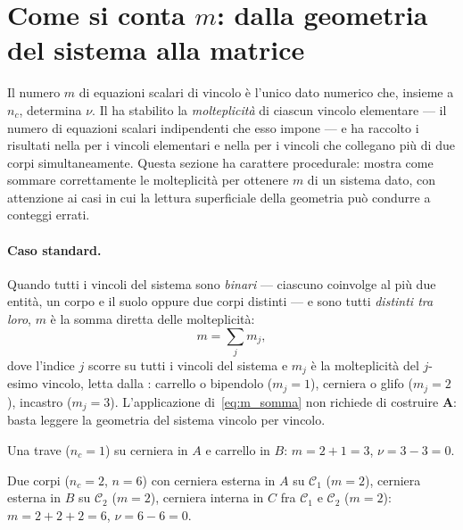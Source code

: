 \section{Come si conta \texorpdfstring{$m$}{m}: dalla geometria del sistema alla matrice}
\label{sec:conteggio_m}

Il numero $m$ di equazioni scalari di vincolo è l'unico dato
numerico che, insieme a $n_c$, determina $\nu$. Il
 ha stabilito la \emph{molteplicità}
di ciascun vincolo elementare --- il numero di equazioni scalari
indipendenti che esso impone --- e ha raccolto i risultati nella
 per i vincoli elementari e nella
 per i vincoli che collegano più
di due corpi simultaneamente. Questa sezione ha carattere
procedurale: mostra come sommare correttamente le molteplicità
per ottenere $m$ di un sistema dato, con attenzione ai casi in
cui la lettura superficiale della geometria può condurre a
conteggi errati.

\paragraph{Caso standard.}
Quando tutti i vincoli del sistema sono \emph{binari} ---
ciascuno coinvolge al più due entità, un corpo e il suolo oppure
due corpi distinti --- e sono tutti \emph{distinti tra loro},
$m$ è la somma diretta delle molteplicità:
\begin{equation}\label{eq:m_somma}
	m = \sum_{j} m_j,
\end{equation}
dove l'indice $j$ scorre su tutti i vincoli del sistema e $m_j$
è la molteplicità del $j$-esimo vincolo, letta dalla
: carrello o bipendolo ($m_j = 1$),
cerniera o glifo ($m_j = 2$), incastro ($m_j = 3$).
L'applicazione di~\eqref{eq:m_somma} non richiede di
costruire $\bm{A}$: basta leggere la geometria del sistema
vincolo per vincolo.

\begin{esempio}
	Una trave ($n_c = 1$) su cerniera in $A$ e carrello in
	$B$: $m = 2 + 1 = 3$, $\nu = 3 - 3 = 0$.
\end{esempio}

\begin{esempio}
	Due corpi ($n_c = 2$, $n = 6$) con cerniera esterna in
	$A$ su $\mathcal{C}_1$ ($m = 2$), cerniera esterna in
	$B$ su $\mathcal{C}_2$ ($m = 2$), cerniera interna in
	$C$ fra $\mathcal{C}_1$ e $\mathcal{C}_2$ ($m = 2$):
	$m = 2 + 2 + 2 = 6$, $\nu = 6 - 6 = 0$.
\end{esempio}

